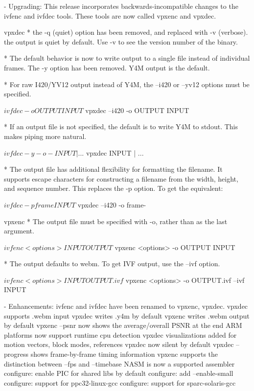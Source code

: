 \begin{DoxyVerbInclude}
  - Upgrading:
    This release incorporates backwards-incompatible changes to the
    ivfenc and ivfdec tools. These tools are now called vpxenc and vpxdec.

    vpxdec
      * the -q (quiet) option has been removed, and replaced with
        -v (verbose). the output is quiet by default. Use -v to see
        the version number of the binary.

      * The default behavior is now to write output to a single file
        instead of individual frames. The -y option has been removed.
        Y4M output is the default.

      * For raw I420/YV12 output instead of Y4M, the --i420 or --yv12
        options must be specified.

          $ ivfdec -o OUTPUT INPUT
          $ vpxdec --i420 -o OUTPUT INPUT

      * If an output file is not specified, the default is to write
        Y4M to stdout. This makes piping more natural.

          $ ivfdec -y -o - INPUT | ...
          $ vpxdec INPUT | ...

      * The output file has additional flexibility for formatting the
        filename. It supports escape characters for constructing a
        filename from the width, height, and sequence number. This
        replaces the -p option. To get the equivalent:

          $ ivfdec -p frame INPUT
          $ vpxdec --i420 -o frame-%

    vpxenc
      * The output file must be specified with -o, rather than as the
        last argument.

          $ ivfenc <options> INPUT OUTPUT
          $ vpxenc <options> -o OUTPUT INPUT

      * The output defaults to webm. To get IVF output, use the --ivf
        option.

          $ ivfenc <options> INPUT OUTPUT.ivf
          $ vpxenc <options> -o OUTPUT.ivf --ivf INPUT


  - Enhancements:
      ivfenc and ivfdec have been renamed to vpxenc, vpxdec.
      vpxdec supports .webm input
      vpxdec writes .y4m by default
      vpxenc writes .webm output by default
      vpxenc --psnr now shows the average/overall PSNR at the end
      ARM platforms now support runtime cpu detection
      vpxdec visualizations added for motion vectors, block modes, references
      vpxdec now silent by default
      vpxdec --progress shows frame-by-frame timing information
      vpxenc supports the distinction between --fps and --timebase
      NASM is now a supported assembler
      configure: enable PIC for shared libs by default
      configure: add --enable-small
      configure: support for ppc32-linux-gcc
      configure: support for sparc-solaris-gcc


\end{DoxyVerbInclude}
